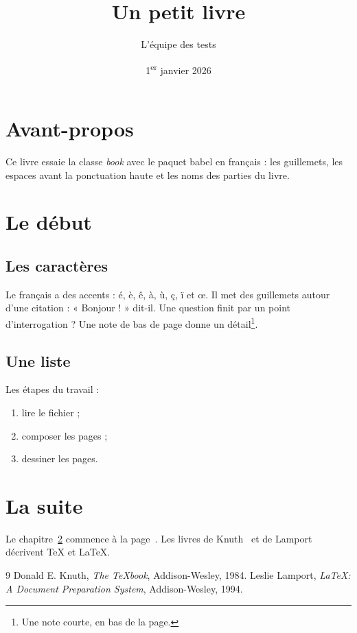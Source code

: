 \documentclass[a4paper,11pt]{book}
\title{Un petit livre}
\author{L'équipe des tests}
\date{1\textsuperscript{er} janvier 2026}
\begin{document}
\frontmatter
\maketitle
\tableofcontents

\chapter{Avant-propos}

Ce livre essaie la classe \emph{book} avec le paquet babel en français :
les guillemets, les espaces avant la ponctuation haute et les noms des
parties du livre.

\mainmatter

\chapter{Le début}\label{chap:debut}

\section{Les caractères}

Le français a des accents : é, è, ê, à, ù, ç, ï et œ. Il met des
guillemets autour d'une citation : « Bonjour ! » dit-il. Une question
finit par un point d'interrogation ? Une note de bas de page donne un
détail\footnote{Une note courte, en bas de la page.}.

\section{Une liste}

Les étapes du travail :
\begin{enumerate}
  \item lire le fichier ;
  \item composer les pages ;
  \item dessiner les pages.
\end{enumerate}

\chapter{La suite}

Le chapitre~\ref{chap:debut} commence à la page~\pageref{chap:debut}.
Les livres de Knuth~\cite{knuth} et de Lamport~\cite{lamport} décrivent
\TeX{} et \LaTeX.

\begin{thebibliography}{9}
 Donald E. Knuth, \emph{The \TeX book}, Addison-Wesley, 1984.
 Leslie Lamport, \emph{\LaTeX: A Document Preparation
  System}, Addison-Wesley, 1994.
\end{thebibliography}
\end{document}
